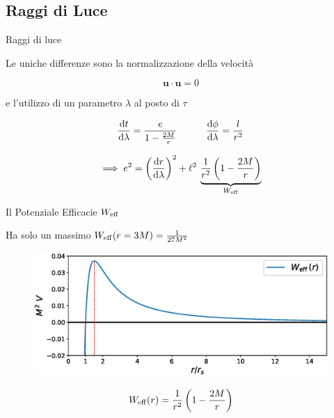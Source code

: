 \subsection{Raggi di Luce}


\begin{frame}{Raggi di luce}

    Le uniche differenze sono la normalizzazione della velocità
    
    \begin{equation*}
        \mathbf{u \cdot u} = 0
    \end{equation*}

    e l'utilizzo di un parametro $\lambda$ al posto di $\tau$

    \begin{equation*}
        \dv{t}{\lambda} = \frac{e}{1 - \frac{2M}{r}} \quad \quad \quad
        \dv{\phi}{\lambda} = \frac{l}{r^2}
    \end{equation*}

    \begin{align*}
        \implies e^2 &= \left( \dv{r}{\lambda} \right)^2 + \ell^2 \,
        \underbrace{\frac{1}{r^2} \left( 1 - \frac{2M}{r} \right)}_{W_{\rm eff}} \\
    \end{align*}

\end{frame}


\begin{frame}{Il Potenziale Efficacie $W_{\rm eff}$}

    Ha solo un massimo $W_{\rm eff} (r = 3M) = \frac{1}{27 M^2}$
        \begin{figure}
            \centering
            \includegraphics[width=\textwidth]{Figures/ch1/W_eff.eps}
        \end{figure}

    \begin{equation*}
        W_{\rm eff} (r) = \frac{1}{r^2} \left( 1 - \frac{2M}{r} \right)
    \end{equation*}

\end{frame}


